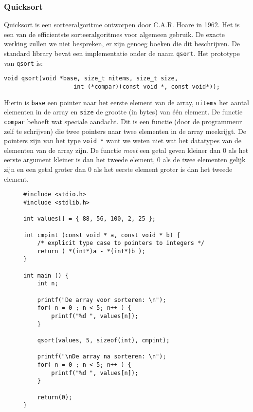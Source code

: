 \subsubsection*{Quicksort}
Quicksort is een sorteeralgoritme ontworpen door C.A.R. Hoare in 1962. Het is een van de efficientste sorteeralgoritmes voor algemeen gebruik. De exacte werking zullen we niet bespreken, er zijn genoeg boeken die dit beschrijven. De standard library bevat een implementatie onder de naam \texttt{qsort}. Het prototype van \texttt{qsort} is:


\hspace*{1em}\texttt{void qsort(void *base, size\_t nitems, size\_t size,}\\
\hspace*{1em}\texttt{\ \ \ \ \ \ \ \ \ \ \ \ \ \ \ \ \ \ \ \  int (*compar)(const void *, const void*));}

Hierin is \texttt{base} een pointer naar het eerste element van de array, \texttt{nitems} het aantal elementen in de array en \texttt{size} de grootte (in bytes) van één element. De functie \texttt{compar} behoeft wat speciale aandacht. Dit is een functie (door de programmeur zelf te schrijven) die twee pointers naar twee elementen in de array meekrijgt. De pointers zijn van het type \texttt{void~*} want we weten niet wat het datatypes van de elementen van de array zijn. De functie \textsl{moet} een getal geven kleiner dan 0 als het eerste argument kleiner is dan het tweede element, 0 als de twee elementen gelijk zijn en een getal groter dan 0 als het eerste element groter is dan het tweede element.

\begin{figure}[!ht]
\begin{lstlisting}[caption=Sorteren van een array met quicksort.,label=cod:poiexampleqsort]
#include <stdio.h>
#include <stdlib.h>

int values[] = { 88, 56, 100, 2, 25 };

int cmpint (const void * a, const void * b) {
    /* explicit type case to pointers to integers */
    return ( *(int*)a - *(int*)b );
}

int main () {
    int n;

    printf("De array voor sorteren: \n");
    for( n = 0 ; n < 5; n++ ) {
        printf("%d ", values[n]);
    }

    qsort(values, 5, sizeof(int), cmpint);

    printf("\nDe array na sorteren: \n");
    for( n = 0 ; n < 5; n++ ) {
        printf("%d ", values[n]);
    }

    return(0);
}
\end{lstlisting}
\end{figure}

